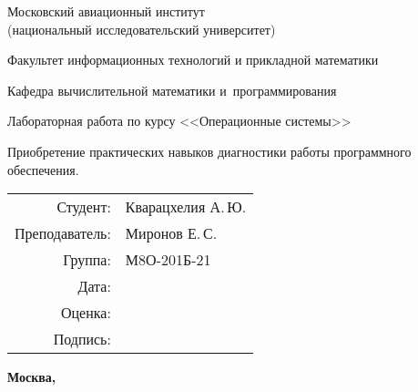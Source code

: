 \begin{titlepage}
	\begin{center}
		\bfseries
		
		{\Large Московский авиационный институт\\ (национальный исследовательский университет)}
		
		\vspace{48pt}
		
		{\large Факультет информационных технологий и прикладной математики}
		
		\vspace{36pt}
		
		{\large Кафедра вычислительной математики и~программирования}
		
		\vspace{48pt}
		
		Лабораторная работа  по курсу <<Операционные системы>>
		
		\vspace{48pt}
		
		Приобретение практических навыков диагностики работы программного обеспечения.
		
	\end{center}
	
	\vspace{150pt}
	
	\begin{flushright}
		\begin{tabular}{rl}
			Студент: & Кварацхелия А.\,Ю. \\
			Преподаватель: & Миронов Е.\,С. \\
			Группа: & М8О-201Б-21 \\
			Дата: & \\
			Оценка: & \\
			Подпись: & \\
		\end{tabular}
	\end{flushright}
	
	\vfill
	
	\begin{center}
		\bfseries
		Москва, \the\year
	\end{center}
\end{titlepage}